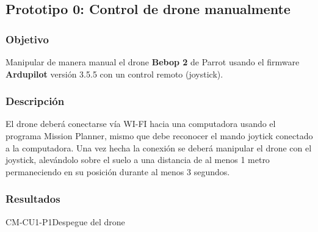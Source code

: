 \subsection{Prototipo 0: Control de drone manualmente}

\subsubsection{Objetivo}
Manipular de manera manual el drone \textbf{Bebop 2} de Parrot usando el firmware \textbf{Ardupilot} versión 3.5.5 con un control remoto (joystick).

\subsubsection{Descripción}
El drone deberá conectarse vía WI-FI hacia una computadora usando el programa Mission Planner, mismo que debe reconocer el mando joytick conectado a la computadora. Una vez hecha la conexión se deberá manipular el drone con el joystick, alevándolo sobre el suelo a una distancia de al menos 1 metro permaneciendo en su posición durante al menos 3 segundos.

\subsubsection{Resultados}

\begin{prueba}{CM-CU1-P1}{Despegue del drone}
\end{prueba}